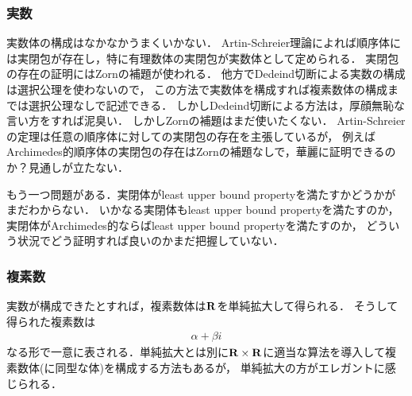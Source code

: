 \subsubsection{実数}
	実数体の構成はなかなかうまくいかない．
	Artin-Schreier理論によれば順序体には実閉包が存在し，特に有理数体の実閉包が実数体として定められる．
	実閉包の存在の証明にはZornの補題が使われる．
	他方でDedeind切断による実数の構成は選択公理を使わないので，
	この方法で実数体を構成すれば複素数体の構成までは選択公理なしで記述できる．
	しかしDedeind切断による方法は，厚顔無恥な言い方をすれば泥臭い．
	しかしZornの補題はまだ使いたくない．
	Artin-Schreierの定理は任意の順序体に対しての実閉包の存在を主張しているが，
	例えばArchimedes的順序体の実閉包の存在はZornの補題なしで，華麗に証明できるのか？見通しが立たない．
	
	もう一つ問題がある．実閉体がleast upper bound propertyを満たすかどうかがまだわからない． 
	いかなる実閉体もleast upper bound propertyを満たすのか，実閉体がArchimedes的ならばleast upper bound propertyを満たすのか，
	どういう状況でどう証明すれば良いのかまだ把握していない．
	
\subsubsection{複素数}
	実数が構成できたとすれば，複素数体は$\mathbf{R}$を単純拡大して得られる．
	そうして得られた複素数は
	\begin{align}
		\alpha + \beta i
	\end{align}
	なる形で一意に表される．単純拡大とは別に$\mathbf{R} \times \mathbf{R}$に適当な算法を導入して複素数体(に同型な体)を構成する方法もあるが，
	単純拡大の方がエレガントに感じられる．

\newpage